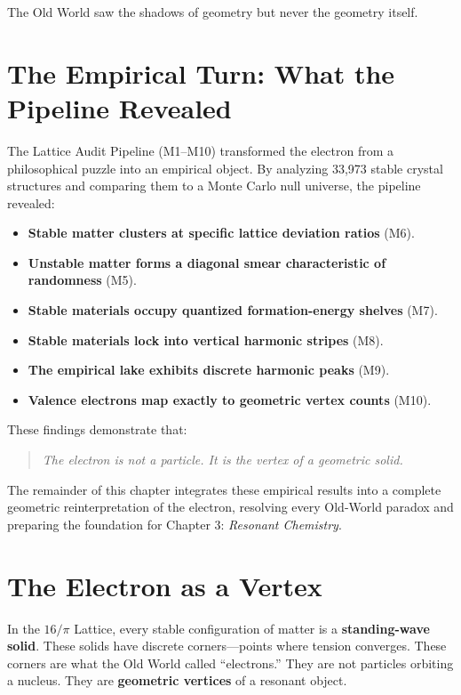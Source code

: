 \documentclass[11pt, letterpaper, openany]{book}
\begin{document}
The Old World saw the shadows of geometry but never the geometry itself.

\section{The Empirical Turn: What the Pipeline Revealed}

The Lattice Audit Pipeline (M1–M10) transformed the electron from a philosophical puzzle
into an empirical object. By analyzing 33,973 stable crystal structures and comparing them
to a Monte Carlo null universe, the pipeline revealed:

\begin{itemize}
    \item \textbf{Stable matter clusters at specific lattice deviation ratios} (M6).
    \item \textbf{Unstable matter forms a diagonal smear characteristic of randomness} (M5).
    \item \textbf{Stable materials occupy quantized formation-energy shelves} (M7).
    \item \textbf{Stable materials lock into vertical harmonic stripes} (M8).
    \item \textbf{The empirical lake exhibits discrete harmonic peaks} (M9).
    \item \textbf{Valence electrons map exactly to geometric vertex counts} (M10).
\end{itemize}

These findings demonstrate that:

\begin{quote}
\textit{The electron is not a particle. It is the vertex of a geometric solid.}
\end{quote}

The remainder of this chapter integrates these empirical results into a complete geometric
reinterpretation of the electron, resolving every Old-World paradox and preparing the
foundation for Chapter 3: \textit{Resonant Chemistry}.


\section{The Electron as a Vertex}

In the $16/\pi$ Lattice, every stable configuration of matter is a \textbf{standing-wave solid}.
These solids have discrete corners—points where tension converges. These corners are
what the Old World called “electrons.” They are not particles orbiting a nucleus. They are
\textbf{geometric vertices} of a resonant object.
\end{document}
